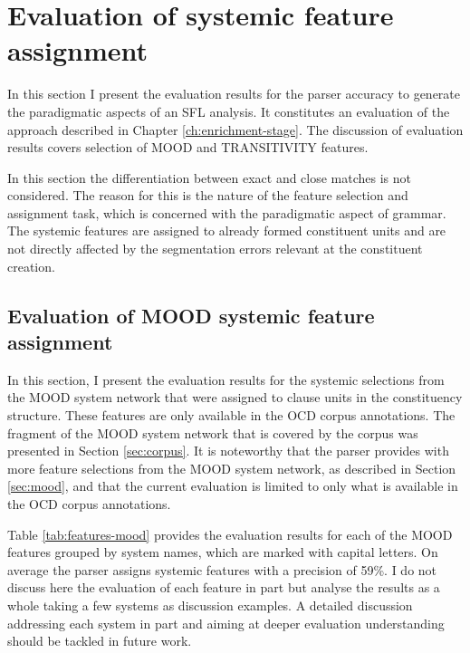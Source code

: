 \section{Evaluation of systemic feature assignment}
\label{sec:systemic-evaluation}
    
    In this section I present the evaluation results for the parser accuracy to generate the paradigmatic aspects of an SFL analysis. It constitutes an evaluation of the approach described in Chapter \ref{ch:enrichment-stage}. The discussion of evaluation results covers selection of MOOD and TRANSITIVITY features. %
    
    In this section the differentiation between exact and close matches is not considered. The reason for this is the nature of the feature selection and assignment task, which is concerned with the paradigmatic aspect of grammar. The systemic features are assigned to already formed constituent units and are not directly affected by the segmentation errors relevant at the constituent creation. 
    
\subsection{Evaluation of MOOD systemic feature assignment}
\label{sec:systemic-evaluation-MOOD}

    In this section, I present the evaluation results for the systemic selections from the MOOD system network that were assigned to clause units in the constituency structure. These features are only available in the OCD corpus annotations. The fragment of the MOOD system network that is covered by the corpus was presented in Section \ref{sec:corpus}. It is noteworthy that the parser provides with more feature selections from the MOOD system network, as described in Section \ref{sec:mood}, and that the current evaluation is limited to only what is available in the OCD corpus annotations.

    Table \ref{tab:features-mood} provides the evaluation results for each of the MOOD features grouped by system names, which are marked with capital letters. On average the parser assigns systemic features with a precision of 59\%. I do not discuss here the evaluation of each feature in part but analyse the results as a whole taking a few systems as discussion examples. A detailed discussion addressing each system in part and aiming at deeper evaluation understanding should be tackled in future work.

